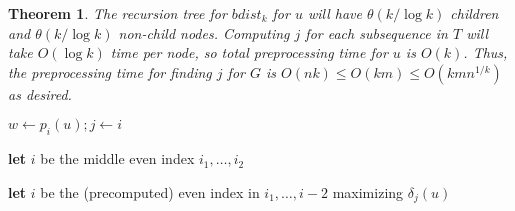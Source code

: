 \documentclass[12pt]{article}
\newtheorem{thm}{Theorem}[section]
\begin{document}
\begin{thm}
The recursion tree for $bdist_k$ for $u$ will have $\theta(k/\log k)$ children and $\theta(k/\log k)$ non-child nodes. Computing $j$ for each subsequence in $T$ will take $O(\log k)$ time per node, so total preprocessing time for $u$ is $O(k)$. Thus, the preprocessing time for finding $j$ for $G$ is $O(nk)\leq O(km)\leq O(kmn^{1/k})$ as desired.
\end{thm}

\begin{Walgo}[ht]{20pt}
  \DontPrintSemicolon
  \Indm
    \Indp
    \BlankLine
    $w \leftarrow p_i(u); j \leftarrow i$
    
    
    \caption{$dist_k(u,v,i)$}
    \label{alg:distk}
\end{Walgo}

\begin{Walgo}[ht]{20pt}
  \DontPrintSemicolon
  \Indm
    \Indp
    \BlankLine
    
    \textbf{let} $i$ be the middle even index $i_1,\hdots,i_2$
    
    \textbf{let} $i$ be the (precomputed) even index in $i_1,\hdots,i-2$ maximizing $\delta_j(u)$
    
    \caption{$bdist_k(u,v,i_1,i_2)$}
    \label{alg:bdistk}
\end{Walgo}



 
\end{document}
